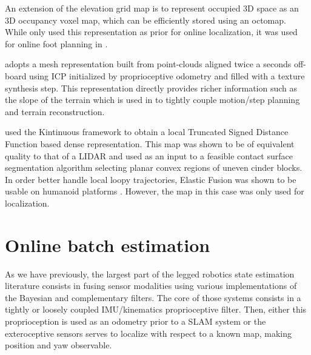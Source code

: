 An extension of the elevation grid map is to represent occupied 3D space as an 3D occupancy voxel map, which can be efficiently stored using an octomap.
While \cite{hornung2014monte, fallon2014drift} only used this representation as prior for online localization, it was used for online foot planning in \cite{winkler2015planning, mastalli2015line}. 

\cite{kolter2009stereo} adopts a mesh representation built from point-clouds aligned twice a seconds off-board using ICP initialized by proprioceptive odometry and filled with
a texture synthesis step. This representation directly provides richer information such as the slope of the terrain which is used in \cite{mastalli2020motion} to 
tightly couple motion/step planning and terrain reconstruction. 

\cite{fallon2015continuous} used the Kintinuous framework to obtain a local Truncated Signed Distance Function based dense representation. This map was
shown to be of equivalent quality to that of a LIDAR and used as an input to a feasible contact surface segmentation algorithm selecting planar convex regions of uneven cinder blocks. 
In order better handle local loopy trajectories, Elastic Fusion was shown to be usable on humanoid platforms \cite{scona2017direct}. 
However, the map in this case was only used for localization.






\section{Online batch estimation}

As we have previously, the largest part of the legged robotics state estimation literature consists in fusing sensor modalities using various 
implementations of the Bayesian and complementary filters. The core of those systems consists in a tightly or loosely coupled IMU/kinematics proprioceptive
filter. Then, either this proprioception is used as an odometry prior to a SLAM system or the exteroceptive sensors serves to localize with respect to a known map,
making position and yaw observable.

